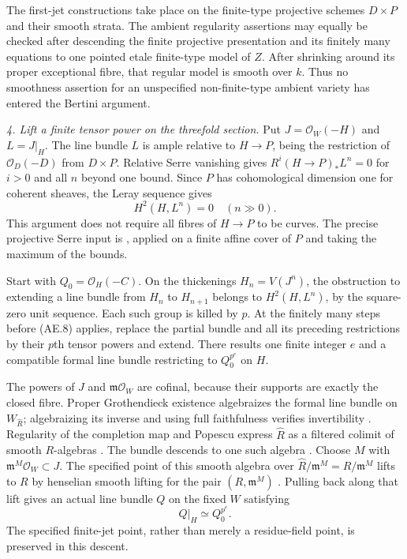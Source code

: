 The first-jet constructions take place on the finite-type
projective schemes $D\times P$ and their smooth strata.  The
ambient regularity assertions may equally be checked after
descending the finite projective presentation and its finitely
many equations to one pointed etale finite-type model of $Z$.
After shrinking around its proper exceptional fibre, that
regular model is smooth over $k$.  Thus no smoothness assertion
for an unspecified non-finite-type ambient variety has entered
the Bertini argument.

\emph{4. Lift a finite tensor power on the threefold section.}
Put $J=\mathcal O_W(-H)$ and $L=J|_H$.
The line bundle $L$ is ample relative to $H\to P$, being the
restriction of $\mathcal O_D(-D)$ from $D\times P$.
Relative Serre vanishing gives
$R^i(H\to P)_*L^n=0$ for $i>0$ and all $n$ beyond one bound.
Since $P$ has cohomological dimension one for coherent sheaves,
the Leray sequence gives
\begin{equation}
                         H^2(H,L^n)=0\quad(n\gg0).    \tag{AE.8}
\end{equation}
This argument does not require all fibres of $H\to P$ to be
curves.  The precise projective Serre input is
\citet[Lemma 30.17.1]{frC3azStacksSerre}, applied on a finite
affine cover of $P$ and taking the maximum of the bounds.

Start with $Q_0=\mathcal O_H(-C)$.  On the thickenings
$H_n=V(J^n)$, the obstruction to extending a line bundle from
$H_n$ to $H_{n+1}$ belongs to $H^2(H,L^n)$, by the square-zero
unit sequence\citep[Lemma 37.4.1]{frC3azStacksPicThickening}.
Each such group is killed by $p$.  At the finitely many steps
before (AE.8) applies, replace the partial bundle and all its
preceding restrictions by their $p$th tensor powers and extend.
There results one finite integer $e$ and a compatible formal
line bundle restricting to $Q_0^{p^e}$ on $H$.

The powers of $J$ and $\mathfrak m\mathcal O_W$ are cofinal,
because their supports are exactly the closed fibre.  Proper
Grothendieck existence algebraizes the formal line bundle on
$W_{\widehat R}$; algebraizing its inverse and using full
faithfulness verifies invertibility
\citep[Lemma 30.24.3]{frC3azStacksExistence}.
Regularity of the completion map and Popescu express
$\widehat R$ as a filtered colimit of smooth $R$-algebras
\citep[Lemma 15.51.14; Theorem 16.12.1]
{frC3azStacksCompletion,frC3azStacksPopescu}.
The bundle descends to one such algebra
\citep[Lemma 32.10.3(2)]{frC3azStacksLimitBundles}.
Choose $M$ with $\mathfrak m^M\mathcal O_W\subset J$.
The specified point of this smooth algebra over
$\widehat R/\mathfrak m^M=R/\mathfrak m^M$ lifts to $R$
by henselian smooth lifting for the pair $(R,\mathfrak m^M)$
\citep[Lemma 15.13.3]{frC3azStacksHenselSmooth}.
Pulling back along that lift gives an actual line bundle $Q$
on the fixed $W$ satisfying
\begin{equation}
                            Q|_H\simeq Q_0^{p^e}.      \tag{AE.9}
\end{equation}
The specified finite-jet point, rather than merely a residue-field
point, is preserved in this descent.

